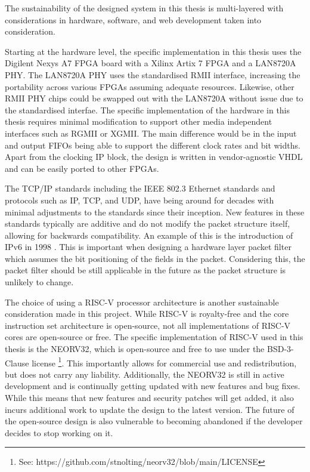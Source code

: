 The sustainability of the designed system in this thesis is multi-layered with considerations in hardware, software, and web development taken into consideration. 

Starting at the hardware level, the specific implementation in this thesis uses the Digilent Nexys A7 FPGA board with a Xilinx Artix 7 FPGA and a LAN8720A PHY. The LAN8720A PHY uses the standardised RMII interface, increasing the portability across various FPGAs assuming adequate resources. Likewise, other RMII PHY chips could be swapped out with the LAN8720A without issue due to the standardised interfae. The specific implementation of the hardware in this thesis requires minimal modification to support other media independent interfaces such as RGMII or XGMII. The main difference would be in the input and output FIFOs being able to support the different clock rates and bit widths. Apart from the clocking IP block, the design is written in vendor-agnostic VHDL and can be easily ported to other FPGAs. 

The TCP/IP standards including the IEEE 802.3 Ethernet standards and protocols such as IP, TCP, and UDP, have being around for decades with minimal adjustments to the standards since their inception. New features in these standards typically are additive and do not modify the packet structure itself, allowing for backwards compatibility. An example of this is the introduction of IPv6 in 1998 \cite{rfc2460}. This is important when designing a hardware layer packet filter which assumes the bit positioning of the fields in the packet. Considering this, the packet filter should be still applicable in the future as the packet structure is unlikely to change.


The choice of using a RISC-V processor architecture is another sustainable consideration made in this project. While RISC-V is royalty-free and the core instruction set architecture is open-source, not all implementations of RISC-V cores are open-source or free. The specific implementation of RISC-V used in this thesis is the NEORV32, which is open-source and free to use under the BSD-3-Clause license \footnote[1]{See: https://github.com/stnolting/neorv32/blob/main/LICENSE}. This importantly allows for commercial use and redistribution, but does not carry any liability. Additionally, the NEORV32 is still in active development and is continually getting updated with new features and bug fixes. While this means that new features and security patches will get added, it also incurs additional work to update the design to the latest version. The future of the open-source design is also vulnerable to becoming abandoned if the developer decides to stop working on it. 


